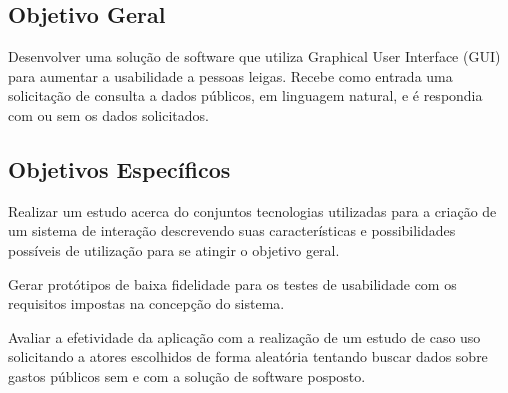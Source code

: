 \subsection{Objetivo Geral}
Desenvolver uma solução de software que utiliza Graphical User Interface (GUI) para aumentar a usabilidade a pessoas leigas. Recebe como entrada uma solicitação de consulta  a dados públicos, em linguagem natural, e é respondia com ou sem os dados solicitados.

\subsection{Objetivos Específicos}
Realizar um estudo acerca do conjuntos tecnologias utilizadas para a criação de um sistema de interação descrevendo suas características e possibilidades possíveis de utilização para se atingir o objetivo geral.

Gerar protótipos de baixa fidelidade para os testes de usabilidade com os requisitos impostas na concepção do sistema.

Avaliar a efetividade da aplicação com a realização de um estudo de caso uso solicitando a atores escolhidos de forma aleatória tentando buscar dados sobre gastos públicos sem e com a solução de software posposto.
